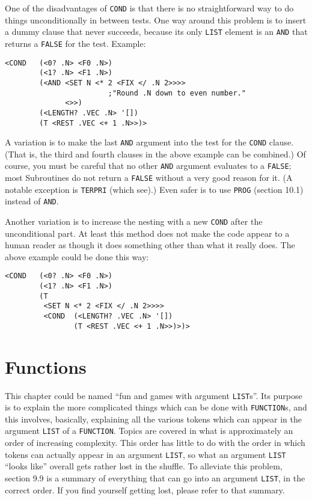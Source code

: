 \documentclass[a4paper]{scrbook}
\begin{document}
One of the disadvantages of \texttt{COND} is that there is no straightforward way to do things unconditionally in between
tests. One way around this problem is to insert a dummy clause that never succeeds, because its only \texttt{LIST} element
is an \texttt{AND} that returns a \texttt{FALSE} for the test. Example:

\begin{verbatim}
<COND   (<0? .N> <F0 .N>)
        (<1? .N> <F1 .N>)
        (<AND <SET N <* 2 <FIX </ .N 2>>>>
                        ;"Round .N down to even number."
              <>>)
        (<LENGTH? .VEC .N> '[])
        (T <REST .VEC <+ 1 .N>>)>
\end{verbatim}

A variation is to make the last \texttt{AND} argument into the test for the \texttt{COND} clause. (That is, the third and
fourth clauses in the above example can be combined.) Of course, you must be careful that no other \texttt{AND} argument
evaluates to a \texttt{FALSE}; most Subroutines do not return a \texttt{FALSE} without a very good reason for it. (A
notable exception is \texttt{TERPRI} (which see).) Even safer is to use \texttt{PROG} (section 10.1) instead of
\texttt{AND}.

Another variation is to increase the nesting with a new \texttt{COND} after the unconditional part. At least this method
does not make the code appear to a human reader as though it does something other than what it really does. The above
example could be done this way:

\begin{verbatim}
<COND   (<0? .N> <F0 .N>)
        (<1? .N> <F1 .N>)
        (T
         <SET N <* 2 <FIX </ .N 2>>>>
         <COND  (<LENGTH? .VEC .N> '[])
                (T <REST .VEC <+ 1 .N>>)>)>
\end{verbatim}

\chapter{Functions}\label{chapter-9.-functions}

This chapter could be named ``fun and games with argument \texttt{LIST}s''. Its purpose is to explain the more complicated
things which can be done with \texttt{FUNCTION}s, and this involves, basically, explaining all the various tokens which can
appear in the argument \texttt{LIST} of a \texttt{FUNCTION}. Topics are covered in what is
approximately an order of increasing complexity. This order has little to do with the order in which tokens can actually
appear in an argument \texttt{LIST}, so what an argument \texttt{LIST} ``looks like'' overall gets rather lost in the
shuffle. To alleviate this problem, section 9.9 is a summary of everything that can go into an argument \texttt{LIST}, in
the correct order. If you find yourself getting lost, please refer to that summary.
\end{document}
